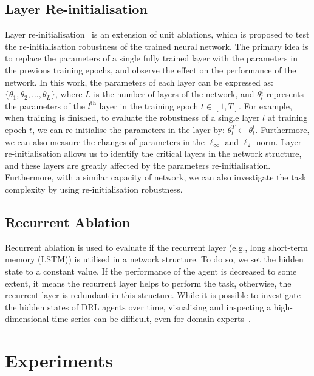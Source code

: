 \subsection{Layer Re-initialisation}
Layer re-initialisation~\cite{zhang2019all} is an extension of unit ablations, which is proposed to test the re-initialisation robustness of the trained neural network. The primary idea is to replace the parameters of a single fully trained layer with the parameters in the previous training epochs, and observe the effect on the performance of the network. In this work, the parameters of each layer can be expressed as: $\{\theta_{1}, \theta_{2}, ..., \theta_{L}\}$, where $L$ is the number of layers of the network, and $\theta_{l}^{t}$ represents the parameters of the $l^\text{th}$ layer in the training epoch $t\in [1,T]$. For example, when training is finished, to evaluate the robustness of a single layer $l$ at training epoch $t$, we can re-initialise the parameters in the layer by: $\theta_{l}^{T} \leftarrow \theta_{l}^{t}$. Furthermore, we can also measure the changes of parameters in the $\ell_{\infty}$ and $\ell_{2}$-norm. Layer re-initialisation allows us to identify the critical layers in the network structure, and these layers are greatly affected by the parameters re-initialisation. Furthermore, with a similar capacity of network, we can also investigate the task complexity by using re-initialisation robustness.

\subsection{Recurrent Ablation}
Recurrent ablation is used to evaluate if the recurrent layer (e.g., long short-term memory (LSTM)) is utilised in a network structure. To do so, we set the hidden state to a constant value. If the performance of the agent is decreased to some extent, it means the recurrent layer helps to perform the task, otherwise, the recurrent layer is redundant in this structure. While it is possible to investigate the hidden states of DRL agents over time, visualising and inspecting a high-dimensional time series can be difficult, even for domain experts~\cite{jaunet2020drlviz}.

\section{Experiments}
\label{ch6:exp}

